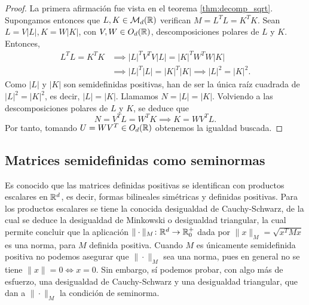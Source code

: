 \begin{proof}
    La primera afirmación fue vista en el teorema \ref{thm:decomp_sqrt}. Supongamos entonces que $L, K \in \mathcal{M}_d(\mathbb{R})$ verifican $M = L^TL = K^TK$. Sean $L = V|L|, K = W|K|$, con $V, W \in O_d(\mathbb{R})$, descomposiciones polares de $L$ y $K$. Entonces,
    \begin{align*}
        L^TL = K^TK &\implies |L|^TV^TV|L| = |K|^TW^TW|K| \\
                    &\implies |L|^T|L| = |K|^T|K| \implies |L|^2 = |K|^2.
    \end{align*}
    Como $|L|$ y $|K|$ son semidefinidas positivas, han de ser la única raíz cuadrada de $|L|^2 = |K|^2$, es decir, $|L|=|K|$. Llamamos $N = |L| = |K|$. Volviendo a las descomposiciones polares de $L$ y $K$, se deduce que
    \[ N = V^TL = W^TK \implies K = WV^TL. \]
    Por tanto, tomando $U = WV^T \in O_d(\mathbb{R})$ obtenemos la igualdad buscada.
\end{proof}

\subsection{Matrices semidefinidas como seminormas}

Es conocido que las matrices definidas positivas se identifican con productos escalares en $\mathbb{R}^d$, es decir, formas bilineales simétricas y definidas positivas. Para los productos escalares se tiene la conocida desigualdad de Cauchy-Schwarz, de la cual se deduce la desigualdad de Minkowski o desigualdad triangular, la cual permite concluir que la aplicación $\|\cdot\|_M \colon \mathbb{R}^d \to \mathbb{R}^+_0$ dada por $\|x\|_M = \sqrt{x^TMx}$ es una norma, para $M$ definida positiva. Cuando $M$ es únicamente semidefinida positiva no podemos asegurar que $\|\cdot\|_M$ sea una norma, pues en general no se tiene $\|x\| = 0 \iff x = 0$. Sin embargo, sí podemos probar, con algo más de esfuerzo, una desigualdad de Cauchy-Schwarz y una desigualdad triangular, que dan a $\|\cdot\|_M$ la condición de seminorma.


